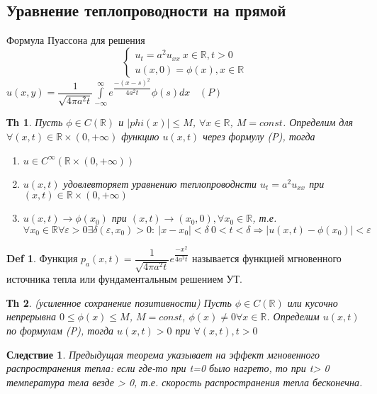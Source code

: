 \documentclass[14pt]{article}
\theoremstyle{plain}
\newtheorem{Thm}{Тh}
\newtheorem{Sled}{Следствие}
\theoremstyle{definition}
\newtheorem{Def}{Def}
\begin{document}
		\subsection{Уравнение теплопроводности на прямой}
			Формула Пуассона для решения
					\begin{equation*}
				\left\{ 
				\begin{array}{ll} 
					u_t = a^2 u_{xx} \ x \in \mathbb{R}, t > 0\\
					u(x,0) = \phi(x), x \in \mathbb{R}  \end{array}\right.
			\end{equation*}
			$u(x,y) = \dfrac{1}{\sqrt{4\pi a^2 t}} \int\limits_{-\infty}^{\infty} e^{\dfrac{-(x-s)^2}{4a^2 t}} \phi(s) dx \ \ \ \  (P)$
			
			\begin{Thm}
				Пусть $\phi \in C(\mathbb{R})$ и $|phi(x)| \leq M$, $\forall x \in \mathbb{R}$, $M = const$. Определим для $\forall(x,t) \in \mathbb{R} \times (0, +\infty)$ функцию $u(x,t)$ через формулу (P), тогда
				\begin{enumerate}
					\item $u \in C^{\infty} (\mathbb{R} \times (0, +\infty))$
					\item $u(x,t)$ удовлевторяет уравнению теплопроводнсти $u_t = a^2 u_{xx}$ при $(x,t) \in \mathbb{R} \times (0, +\infty)$
					\item $u(x,t) \to \phi(x_0)$ при $(x,t) \to (x_0, 0), \forall x_0 \in \mathbb{R}$, т.е. $\forall x_0 \in \mathbb{R} \forall \varepsilon > 0 \exists \delta(\varepsilon, x_0) > 0: \ |x - x_0| < \delta \ 0 < t < \delta \Rightarrow |u(x,t) - \phi(x_0)| < \varepsilon$
				\end{enumerate}
			\end{Thm}
		\begin{Def}
			Функция $p_a(x,t) = \dfrac{1}{\sqrt{4\pi a^2 t}} e^{\dfrac{-x^2}{4a^2 t}}$ называется функцией мгновенного источника тепла или фундаментальным решением УТ.
		\end{Def}
		\begin{Thm}
			(усиленное сохранение позитивности)\newline
			Пусть $\phi \in C(\mathbb{R})$ или кусочно непрерывна $0 \leq \phi(x) \leq M$, $M = const$, $\phi(x) \neq 0 \forall x \in \mathbb{R}$. Определим $u(x,t)$ по формулам (P), тогда $u(x,t) > 0$ при $\forall (x,t), t > 0$
		\end{Thm}
		\begin{Sled}
			Предыдущая теорема указывает на эффект мгновенного распространения тепла: если где-то при t=0 было нагрето, то при t> 0 температура тела везде > 0, т.е. скорость распространения тепла бесконечна.
		\end{Sled}
\end{document}
